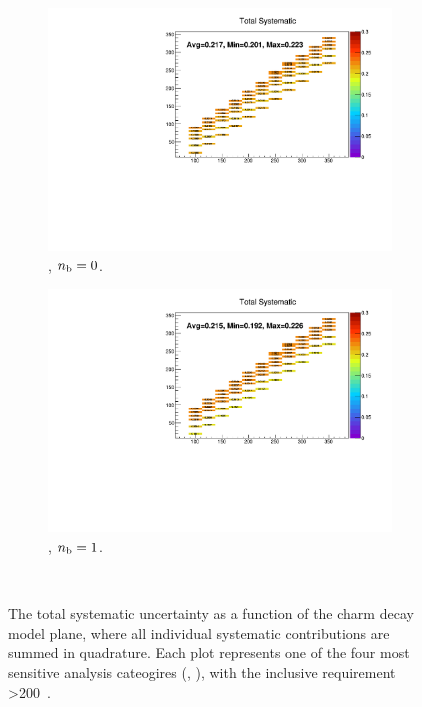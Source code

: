 \begin{figure}[h!]
  \begin{subfigure}[b]{0.47\textwidth}
    \includegraphics[width=\textwidth]{Figs/sms/t2cc/v37_3/systs/total_T2cc_eq0b_ge4j_incl.pdf}
    \caption{\njhigh, $n_{\text{b}} = 0$.}
  \end{subfigure}
  \begin{subfigure}[b]{0.47\textwidth}
    \includegraphics[width=\textwidth]{Figs/sms/t2cc/v37_3/systs/total_T2cc_eq1b_ge4j_incl.pdf}
    \caption{\njhigh, $n_{\text{b}} = 1$.}
  \end{subfigure}\\
  \caption{The total systematic uncertainty as a function of the charm decay
  model plane,
  where all individual systematic contributions are summed in quadrature.
  Each plot represents one of the four most sensitive 
  analysis cateogires (\nb, \nj), with the inclusive requirement \HT>200~\gev.}
  \label{fig:sms-totalsyst-t2cc}
\end{figure}

